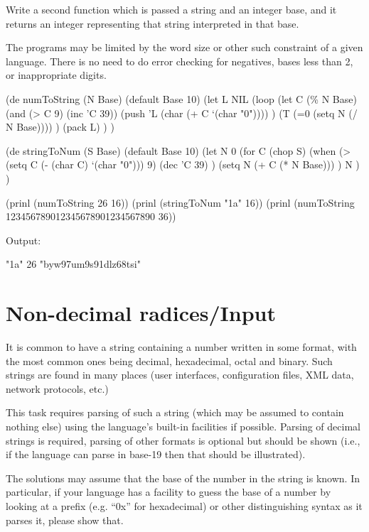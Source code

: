 Write a second function which is passed a string and an integer base,
and it returns an integer representing that string interpreted in that
base.

The programs may be limited by the word size or other such constraint of
a given language. There is no need to do error checking for negatives,
bases less than 2, or inappropriate digits.


\begin{wideverbatim}

(de numToString (N Base)
   (default Base 10)
   (let L NIL
      (loop
         (let C (\% N Base)
            (and (> C 9) (inc 'C 39))
            (push 'L (char (+ C `(char "0")))) )
         (T (=0 (setq N (/ N Base)))) )
      (pack L) ) )

(de stringToNum (S Base)
   (default Base 10)
   (let N 0
      (for C (chop S)
         (when (> (setq C (- (char C) `(char "0"))) 9)
            (dec 'C 39) )
         (setq N (+ C (* N Base))) )
      N ) )

(prinl (numToString 26 16))
(prinl (stringToNum "1a" 16))
(prinl (numToString 123456789012345678901234567890 36))

Output:

"1a"
26
"byw97um9s91dlz68tsi"

\end{wideverbatim}

\pagebreak{}
\section*{Non-decimal radices/Input}

It is common to have a string containing a number written in some
format, with the most common ones being decimal, hexadecimal, octal and
binary. Such strings are found in many places (user interfaces,
configuration files, XML data, network protocols, etc.)

This task requires parsing of such a string (which may be assumed to
contain nothing else) using the language's built-in facilities if
possible. Parsing of decimal strings is required, parsing of other
formats is optional but should be shown (i.e., if the language can parse
in base-19 then that should be illustrated).

The solutions may assume that the base of the number in the string is
known. In particular, if your language has a facility to guess the base
of a number by looking at a prefix (e.g. ``0x'' for hexadecimal) or
other distinguishing syntax as it parses it, please show that.

